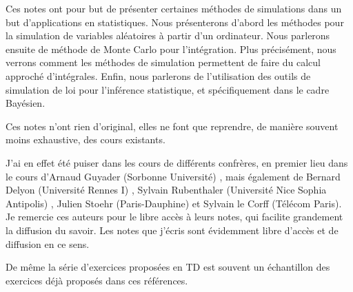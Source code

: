 Ces notes ont pour but de présenter certaines méthodes de simulations dans un but d'applications en statistiques.
Nous présenterons d'abord les méthodes pour la simulation de variables aléatoires à partir d'un ordinateur. 
Nous parlerons ensuite de méthode de Monte Carlo pour l'intégration. 
Plus précisément, nous verrons comment les méthodes de simulation permettent de faire du calcul approché d'intégrales. 
Enfin, nous parlerons de l'utilisation des outils de simulation de loi pour l'inférence statistique, et spécifiquement dans le cadre Bayésien.

\vspace{\baselineskip}

Ces notes n'ont rien d'original, elles ne font que reprendre, de manière souvent moins exhaustive, des cours existants.

J'ai en effet été puiser dans les cours de différents confrères, en premier lieu dans le cours d'Arnaud Guyader (Sorbonne Université) \citep{guyader2018methodes}, mais également de Bernard Delyon (Université Rennes I)  \citep{delyon2017simulation}, Sylvain Rubenthaler (Université Nice Sophia Antipolis) \citep{rubenthaler2018methodes}, Julien Stoehr (Paris-Dauphine) et Sylvain le Corff (Télécom Paris). Je remercie ces auteurs pour le libre accès à leurs notes, qui facilite grandement la diffusion du savoir. Les notes que j'écris sont évidemment libre d'accès et de diffusion en ce sens.

De même la série d'exercices proposées en TD est souvent un échantillon des exercices déjà proposés dans ces références. 